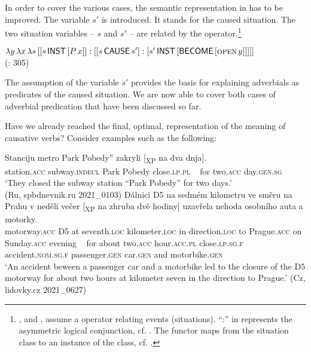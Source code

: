 \documentclass[output=paper]{langscibook}
\begin{document}
\noindent In order to cover the various cases, the semantic representation in  has to be improved. The variable $s'$ is introduced. It stands for the caused situation. The two situation variables -- $s$ and $s'$ -- are related by the  operator.\footnote{\citet{Davidson1967b,Dowty1979}, and \citet{Bierwisch2002,Bierwisch2005}, assume a  operator relating events (situations). “:” in  represents the asymmetric logical conjunction, cf. \citet{Heidolph1992}. The  functor maps from the situation class to an instance of the class, cf. \citet[176]{Bierwisch1990cluster}.}

\ea%
    \label{ex:junghanns:27}
$\lambda y \, \lambda x \, \lambda s \, [[s\, \cnstx{inst} \, [P\, x]] : [[s\, \cnstx{cause}\, s'] : [s'\, \cnstx{inst} \, [\cnstx{become} \, [\textsc{open}\, y]]]]]$\\
  \hfill (\citealt{Fehrmannetal2014}: 305)
\z

\noindent The assumption of the variable $s'$ %
provides the basis for explaining adverbials as predicates of the caused situation. We are now able to cover both cases of adverbial predication that have been discussed so far.

Have we already reached the final, optimal, representation of the meaning of causative verbs? Consider examples such as the following:

\ea%
    \label{ex:junghanns:28}
\gll Stanciju metro  Park Pobedy” zakryli [\textsubscript{XP} na dva dnja].\\
  station.\textsc{acc} subway.\textsc{indecl} {} Park Pobedy close.\textsc{lp.pl}  ~ for two.\textsc{acc} day.\textsc{gen.sg}\\
    \glt ‘They closed the subway station “Park Pobedy” for two days.’ \\ \hfill(Ru, spbdnevnik.ru 2021\_0103)
\ex%
    \label{ex:junghanns:29}
\gll Dálnici D5 na sedmém kilometru ve směru na Prahu v neděli večer [\textsubscript{XP} na zhruba dvě hodiny] uzavřela nehoda osobního auta a motorky.\\
  motorway.\textsc{acc} D5 at seventh.\textsc{loc} kilometer.\textsc{loc} in direction.\textsc{loc} to Prague.\textsc{acc} on Sunday.\textsc{acc} evening  ~ for about two.\textsc{acc} hour.\textsc{acc.pl} close.\textsc{lp.sg.f} accident.\textsc{nom.sg.f} passenger.\textsc{gen} car.\textsc{gen} and motorbike.\textsc{gen}\\
    \glt ‘An accident beween a passenger car and a motorbike led to the closure of the D5 motorway for about two hours at kilometer seven in the direction to Prague.’ \hfill(Cz, lidovky.cz 2021\_0627)
\z
\end{document}
